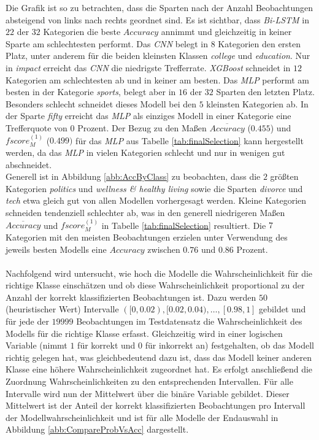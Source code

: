 \documentclass[a4paper,11pt]{article}
\begin{document}
Die Grafik ist so zu betrachten, dass die Sparten nach der Anzahl Beobachtungen absteigend von links nach rechts geordnet sind. Es ist sichtbar, dass \textit{Bi-LSTM} in $22$ der $32$ Kategorien die beste $Accuracy$ annimmt und gleichzeitig in keiner Sparte am schlechtesten performt. Das \textit{CNN} belegt in $8$ Kategorien den ersten Platz, unter anderem für die beiden kleinsten Klassen \textit{college} und \textit{education}. Nur in \textit{impact} erreicht das \textit{CNN} die niedrigste Trefferrate.
\textit{XGBoost} schneidet in $12$ Kategorien am schlechtesten ab und in keiner am besten. Das \textit{MLP} performt am besten in der Kategorie \textit{sports}, belegt aber in $16$ der $32$ Sparten den letzten Platz. Besonders schlecht schneidet dieses Modell bei den $5$ kleinsten Kategorien ab. In der Sparte \textit{fifty} erreicht das \textit{MLP} als einziges Modell in einer Kategorie eine Trefferquote von $0$ Prozent. Der Bezug zu den Maßen $\overline{Accuracy}$ ($0.455$) und $fscore_M^{(1)}$ ($0.499)$ für das \textit{MLP} aus Tabelle \ref{tab:finalSelection} kann hergestellt werden, da das \textit{MLP} in vielen Kategorien schlecht und nur in wenigen gut abschneidet. \\
Generell ist in Abbildung \ref{abb:AccByClass} zu beobachten, dass die $2$ größten Kategorien \textit{politics} und \textit{wellness \& healthy living} sowie die Sparten \textit{divorce} und \textit{tech} etwa gleich gut von allen Modellen vorhergesagt werden. Kleine Kategorien schneiden tendenziell schlechter ab, was in den generell niedrigeren Maßen $\overline{Accuracy}$ und $fscore_M^{(1)}$ in Tabelle \ref{tab:finalSelection} resultiert. Die $7$ Kategorien mit den meisten Beobachtungen erzielen unter Verwendung des jeweils besten Modells eine $Accuracy$ zwischen $0.76$ und $0.86$ Prozent. \\
\\
Nachfolgend wird untersucht, wie hoch die Modelle die Wahrscheinlichkeit für die richtige Klasse einschätzen und ob diese Wahrscheinlichkeit proportional zu der Anzahl der korrekt klassifizierten Beobachtungen ist. Dazu werden $50$ (heuristischer Wert) Intervalle $([0, 0.02), [0.02, 0.04), \dots, [0.98, 1]$ gebildet und für jede der $19999$ Beobachtungen im Testdatensatz die Wahrscheinlichkeit des Modells für die richtige Klasse erfasst. Gleichzeitig wird in einer logischen Variable (nimmt $1$ für korrekt und $0$ für inkorrekt an) festgehalten, ob das Modell richtig gelegen hat, was gleichbedeutend dazu ist, dass das Modell keiner anderen Klasse eine höhere Wahrscheinlichkeit zugeordnet hat.
Es erfolgt anschließend die Zuordnung Wahrscheinlichkeiten zu den entsprechenden Intervallen. Für alle Intervalle wird nun der Mittelwert über die binäre Variable gebildet. Dieser Mittelwert ist der Anteil der korrekt klassifizierten Beobachtungen pro Intervall der Modellwahrscheinlichkeit und ist für alle Modelle der Endauswahl in Abbildung \ref{abb:CompareProbVsAcc} dargestellt.
\end{document}
